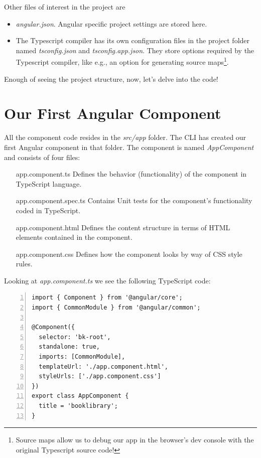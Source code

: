\documentclass{report}
\begin{document}
Other files of interest in the project are
\begin{itemize}
	\item \textsl{angular.json}. Angular specific project settings are stored here.
	\item The Typescript compiler has its own configuration files in the project folder named \textsl{tsconfig.json} and \textsl{tsconfig.app.json}. They store options required by the Typescript compiler, like e.g., an option for generating source maps\footnote{Source maps allow us to debug our app in the browser's dev console with the original Typescript source code!}.
\end{itemize}

Enough of seeing the project structure, now, let's delve into the code!

\section{Our First Angular Component}
All the component code resides in the \textsl{src/app} folder. The CLI has created our first Angular component in that folder. The component is named \textsl{AppComponent} and consists of four files:

\begin{itemize}
	\item[app.component.ts]Defines the behavior (functionality) of the component in TypeScript language.
	\item[app.component.spec.ts]Contains Unit tests for the component's functionality coded in TypeScript.
	\item[app.component.html]Defines the content structure in terms of HTML elements contained in the component.
	\item[app.component.css]Defines how the component looks by way of CSS style rules.
\end{itemize}

Looking at \textsl{app.component.ts} we see the following TypeScript code:
\begin{Verbatim}[numbers=left]
import { Component } from '@angular/core';
import { CommonModule } from '@angular/common';

@Component({
  selector: 'bk-root',
  standalone: true,
  imports: [CommonModule],
  templateUrl: './app.component.html',
  styleUrls: ['./app.component.css']
})
export class AppComponent {
  title = 'booklibrary';
}
\end{Verbatim}
\end{document}
